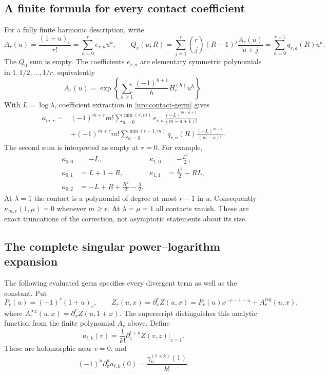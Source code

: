 \subsection{A finite formula for every contact coefficient}

For a fully finite harmonic description, write
\[
 A_r(u)=\frac{(1+u)_r}{r!}
       =\sum_{a=0}^r e_{r,a}u^a,
 \qquad
 Q_r(u;R)=\sum_{j=1}^r\binom rj(R-1)^j\frac{A_r(u)}{u+j}
       =\sum_{a=0}^{r-1}q_{r,a}(R)u^a.
\]
The $Q_0$ sum is empty. The coefficients $e_{r,a}$ are elementary
symmetric polynomials in $1,1/2,\ldots,1/r$, equivalently
\begin{equation}\label{urc:harmonic-generator}
 A_r(u)=\exp\left\{\sum_{h\ge1}
        \frac{(-1)^{h+1}}h H_r^{(h)}u^h\right\}.
\end{equation}
With $L=\log\lambda$, coefficient extraction in
\eqref{urc:contact-germ} gives
\begin{equation}\label{urc:finite-coefficients}
 \begin{aligned}
 \kappa_{m,r}={}&(-1)^{m+r}m!
 \sum_{a=0}^{\min(r,m)}e_{r,a}
          \frac{(-L)^{m-a+1}}{(m-a+1)!}\\
 &+(-1)^{m+r}m!
 \sum_{a=0}^{\min(r-1,m)}q_{r,a}(R)
          \frac{(-L)^{m-a}}{(m-a)!}.
 \end{aligned}
\end{equation}
The second sum is interpreted as empty at $r=0$. For example,
\begin{align*}
 \kappa_{0,0}&=-L,&
 \kappa_{1,0}&=-\frac{L^2}{2},\\
 \kappa_{0,1}&=L+1-R,&
 \kappa_{1,1}&=\frac{L^2}{2}-RL,\\
 \kappa_{0,2}&=-L+R+\frac{R^2}{2}-\frac32.
\end{align*}
At $\lambda=1$ the contact is a polynomial of degree at most $r-1$
in $u$. Consequently $\kappa_{m,r}(1,\mu)=0$ whenever $m\ge r$.
At $\lambda=\mu=1$ all contacts vanish. These are exact truncations
of the correction, not asymptotic statements about its size.

\subsection{The complete singular power--logarithm expansion}

The following evaluated germ specifies every divergent term as well
as the constant. Put
\begin{equation}\label{urc:local-decomposition}
 P_r(u)=(-1)^r(1+u)_r,\qquad
 Z_r(u,x)=\partial_x^r Z(u,x)
         =P_r(u)x^{-r-1-u}+A_r^{\mathrm{reg}}(u,x),
\end{equation}
where $A_r^{\mathrm{reg}}(u,x)=\partial_x^r Z(u,1+x)$.
The superscript distinguishes this analytic function from the finite
polynomial $A_r$ above. Define
\begin{equation}\label{urc:analytic-coefficients}
 a_{t,k}(v)=\frac1{k!}\partial_z^{t+k}Z(v,z)\big|_{z=1}.
\end{equation}
These are holomorphic near $v=0$, and
\[
 (-1)^n\partial_v^n a_{t,k}(0)
      =\frac{\gamma_n^{(t+k)}(1)}{k!}.
\]


